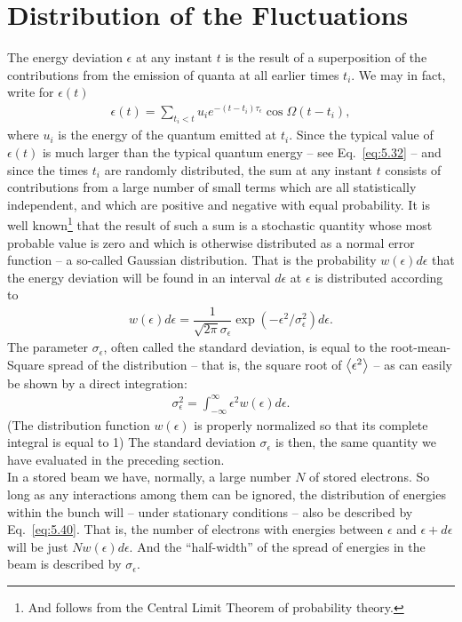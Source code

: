 \section{Distribution of the Fluctuations}\label{sec:5.3}

The energy deviation $\epsilon$ at any instant $t$ is the result of a superposition of the
contributions from the emission of quanta at all earlier times $t_i$. We may in fact, write for $\epsilon(t)$
\begin{align} \label{eq:5.49}
	\epsilon(t) = \sum_{t_i<t} u_i e^{-(t-t_i)\tau_\epsilon}\cos\Omega(t-t_i),
\end{align}
where $u_i$ is the energy of the quantum emitted at $t_i$. Since the typical value of $\epsilon(t)$ is much larger than the typical quantum energy -- see Eq.~\eqref{eq:5.32} -- and since the times $t_i$ are randomly distributed, the sum at any instant $t$ consists of contributions from a large number of small terms which are all statistically independent, and which are positive and negative with equal probability. It is well known\footnote{And follows from the Central Limit Theorem of probability theory.} that the result of such a sum is a stochastic quantity whose most probable value is zero and which is otherwise distributed as a normal error function -- a so-called Gaussian distribution. That is the probability $w(\epsilon)d\epsilon$ that the energy deviation
will be found in an interval $d\epsilon$ at $\epsilon$ is distributed according to
\begin{align}\label{eq:5.50}
	w(\epsilon)d\epsilon = \dfrac{1}{\sqrt{2\pi}\sigma_\epsilon} \exp{(-\epsilon^2/\sigma_\epsilon^2)}d\epsilon.
\end{align}
The parameter $\sigma_\epsilon$, often called the standard deviation, is equal to the root-mean-
Square spread of the distribution -- that is, the square root of $\left< \epsilon^2 \right>$ -- as can
easily be shown by a direct integration:
\begin{align}
	\sigma_\epsilon^2 = \int_{-\infty}^{\infty} \epsilon^2 w(\epsilon) d\epsilon.
\end{align}
(The distribution function $w(\epsilon)$ is properly normalized so that its complete integral
is equal to 1) The standard deviation $\sigma_\epsilon$ is then, the same quantity we have evaluated in the preceding section.\\
In a stored beam we have, normally, a large number $N$ of stored electrons. So long as any interactions among them can be ignored, the distribution of energies within the bunch will -- under stationary conditions -- also be described by Eq.~\eqref{eq:5.40}. That is, the number of electrons with energies between $\epsilon$ and $\epsilon+d\epsilon$ will be just $Nw(\epsilon)d\epsilon$. And the ``half-width'' of the spread of energies in the beam is described by $\sigma_\epsilon$.\\
